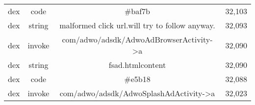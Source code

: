 \begin{table}[t]
{\begin{tabular}{|c|c|c|c|}
			dex      & code     & \#baf7b                                                   & 32,103 \\ %
			dex      & string   & malformed click url.will try to follow anyway.            & 32,093 \\
			dex      & invoke   & com/adwo/adsdk/AdwoAdBrowserActivity->a                   & 32,090 \\
			dex      & string   & fsad.htmlcontent                                          & 32,090 \\
			dex      & code     & \#e5b18                                                   & 32,088 \\
			dex      & invoke   & com/adwo/adsdk/AdwoSplashAdActivity->a                    & 32,023 \\
			\hline
		\end{tabular}
	}
	\label{table:apgraph:rev}
\end{table}

